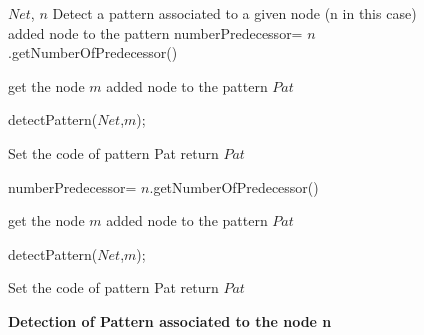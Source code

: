 
\begin{figure}[!t]
\begin{algorithmic}[1]
\REQUIRE $Net$, $n$
\ENSURE Detect a pattern associated to a given node (n in this case)
\STATE 
\STATE 
{}
   \STATE added node to the pattern
   \STATE numberPredecessor= $n$.getNumberOfPredecessor() 
   
    \STATE get the node $m$
      \STATE added node to the pattern $Pat$
    \ENDCASE
    
      \STATE detectPattern($Net$,$m$);
    \ENDCASE
    
    \ENDSWITCH
   \ENDFOR
      \STATE Set the code of pattern Pat
      \STATE return $Pat$
   \ENDCASE
   
   \ENDSWITCH
\ENDCASE
   
   \STATE numberPredecessor= $n$.getNumberOfPredecessor() 
   
    \STATE get the node $m$
      \STATE added node to the pattern $Pat$
    \ENDCASE
    
      \STATE detectPattern($Net$,$m$);
    \ENDCASE
    
    \ENDSWITCH
   \ENDFOR
      \STATE Set the code of pattern Pat
      \STATE return $Pat$
   \ENDCASE
   
   \ENDSWITCH
\ENDCASE
\ENDSWITCH
\end{algorithmic}
\caption{\bf Detection of Pattern associated to the node n} \label{PatternDetectionNode}
\end{figure}



